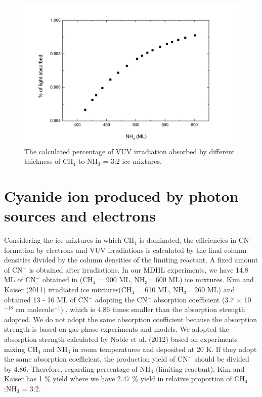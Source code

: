 {\begin{figure}
\centering
\includegraphics[width=\textwidth]{figures/chapter4/absorption_percentage.png}
\caption{The calculated percentage of VUV irradiation absorbed by different thickness of CH$_4$ to NH$_3$ = 3:2 ice mixtures.}
\label{fig:absorption_percentage}
\end{figure}

\section{Cyanide ion produced by photon sources and electrons} %

Considering the ice mixtures in which CH$_4$ is dominated, the efficiencies in CN$^-$ formation by electrons and VUV irradiations is calculated by the final column densities divided by the column densities of the limiting reactant. A fixed amount of CN$^-$ is obtained after irradiations. In our MDHL experiments, we have 14.8 ML of CN$^-$ obtained in (CH$_4$ = 900 ML, NH$_3$= 600 ML) ice mixtures. Kim and Kaiser (2011) irradiated  ice mixtures(CH$_4$ = 610 ML, NH$_3$= 260 ML) and obtained 13 - 16 ML of CN$^-$ adopting the CN$^-$ absorption coefficient (3.7 $\times$ 10$^{-18}$ cm molecule$^{-1}$) \cite{georgieva2006computational}, which is 4.86 times smaller than the absorption strength adopted. We do not adopt the same absorption coefficient because the absorption strength is based on gas phase experiments and models. We adopted the absorption strength calculated by Noble et al. (2012) \cite{noble2012thermal} based on experiments mixing CH$_4$ and NH$_3$ in room temperatures and deposited at 20 K. If they adopt the same absorption coefficient, the production yield of CN$^-$ should be divided by 4.86. Therefore, regarding percentage of NH$_3$ (limiting reactant), Kim and Kaiser has 1 \% yield where we have 2.47 \% yield in relative proportion of CH$_4$:NH$_3$ = 3:2.

}

